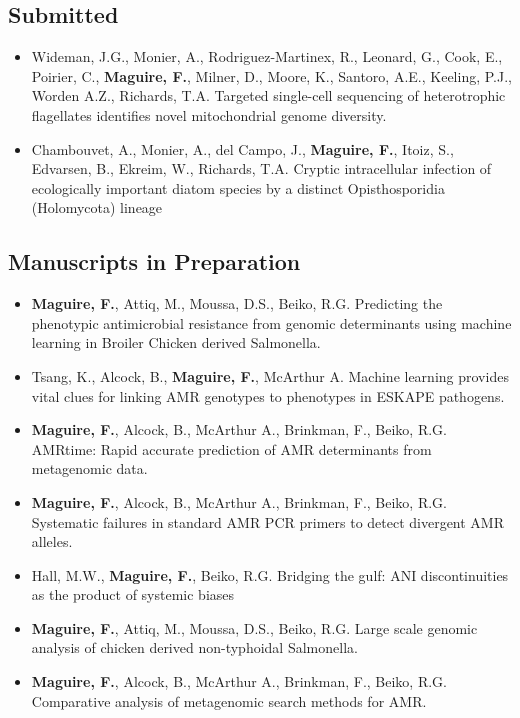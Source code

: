 \documentclass[10pt,a4paper,sans]{moderncv}        %
\begin{document}
\subsection{Submitted}
\begin{itemize}
      \item Wideman, J.G., Monier, A., Rodriguez-Martinex, R., Leonard, G., Cook, E., Poirier, C., \textbf{Maguire, F.}, Milner, D., Moore, K., Santoro, A.E., Keeling, P.J., Worden A.Z., Richards, T.A. Targeted single-cell sequencing of heterotrophic flagellates identifies novel mitochondrial genome diversity.
      \item Chambouvet, A., Monier, A., del Campo, J., \textbf{Maguire, F.}, Itoiz, S., Edvarsen, B., Ekreim, W., Richards, T.A. Cryptic intracellular infection of
ecologically important diatom species by a distinct Opisthosporidia (Holomycota) lineage
\end{itemize}

\subsection{Manuscripts in Preparation}

\begin{itemize}
        \item \textbf{Maguire, F.}, Attiq, M., Moussa, D.S., Beiko, R.G.
        Predicting the phenotypic antimicrobial resistance from genomic determinants using machine learning in 
Broiler Chicken derived Salmonella.
    \item Tsang, K., Alcock, B., \textbf{Maguire, F.}, McArthur A. Machine learning provides vital clues for linking AMR genotypes to phenotypes in ESKAPE pathogens.
       \item \textbf{Maguire, F.}, Alcock, B., McArthur A., Brinkman, F., Beiko, R.G. AMRtime: Rapid accurate prediction of AMR determinants from metagenomic data. 
 \item \textbf{Maguire, F.}, Alcock, B., McArthur A., Brinkman, F., Beiko, R.G. 
     Systematic failures in standard AMR PCR primers to detect divergent AMR alleles. 
    \item Hall, M.W., \textbf{Maguire, F.}, Beiko, R.G. Bridging the gulf: ANI discontinuities as the product of systemic biases
    \item \textbf{Maguire, F.}, Attiq, M., Moussa, D.S., Beiko, R.G. Large scale genomic analysis of chicken derived non-typhoidal Salmonella.
    \item \textbf{Maguire, F.}, Alcock, B., McArthur A., Brinkman, F., Beiko, R.G. Comparative analysis of metagenomic search methods for AMR. 
\end{itemize}
\end{document}
